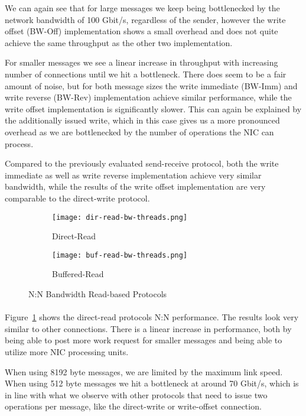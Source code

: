 We can again see that for large messages we keep being bottlenecked by the network bandwidth of 100 Gbit/s, regardless of 
the sender, however the write offset (BW-Off) implementation shows a small overhead and does not quite achieve the same 
throughput as the other two implementation. 

For smaller messages we see a linear increase in throughput with increasing number of connections until we hit a bottleneck. 
There does seem to be a fair amount of noise,
but for both message sizes the write immediate (BW-Imm) and write reverse (BW-Rev) implementation achieve similar performance,
while the write offset implementation is significantly slower. This can again be explained by the additionally issued write, 
which in this case  gives us a more pronounced overhead as we are bottlenecked by the number of operations the NIC can process.


Compared to the previously evaluated send-receive protocol, both the write immediate as well as write reverse implementation
achieve very 
similar bandwidth, while the results of the write offset implementation are very comparable to the direct-write protocol.


\begin{figure}[ht]
  \begin{subfigure}[b]{0.49\textwidth}
  \centering
  \texttt{[image: dir-read-bw-threads.png]}
  \caption{Direct-Read}
  \label{fig:plot-dirread-bw-threads}
  \end{subfigure}
  \begin{subfigure}[b]{0.49\textwidth}
  \centering
  \texttt{[image: buf-read-bw-threads.png]}
  \caption{Buffered-Read}
  \label{fig:plot-bufread-bw-threads}
  \end{subfigure}
  \caption{N:N Bandwidth Read-based Protocols}
\end{figure}

\paragraph{}Figure~\ref{fig:plot-dirread-bw-threads} shows the direct-read protocols N:N performance. The results look very similar to 
other connections. There is a linear increase in performance, both by being able to post more work request for smaller 
messages and being able to utilize more NIC processing units.~\cite{anuj-guide}

When using 8192 byte messages, we are limited by the maximum link speed. When using 512 byte messages we hit a bottleneck at
around 70 Gbit/s, which is in line with what we observe with other protocols that need to issue two operations per message, 
like the direct-write or write-offset connection.



